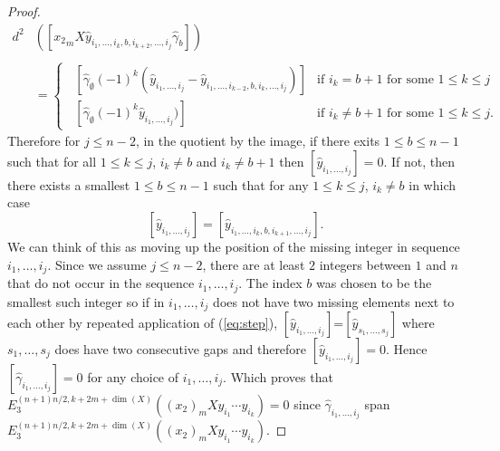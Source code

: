 \documentclass{article}
\theoremstyle{plain}
\theoremstyle{definition}
\numberwithin{thm}{section}
\begin{document}
\begin{proof}
				\begin{align*}
					d^2&([{x_2}_mX\hat{y}_{i_1,\dots,i_k,b,i_{k+2},\dots,i_j}\hat\gamma_b])
					\\
					\\
					&=
					\begin{cases}
							\;\; [\hat{\gamma}_{\emptyset}(-1)^{k}(\hat{y}_{i_1,\dots,i_j}-\hat{y}_{i_1,\dots,i_{k-2},b,i_k,\dots,i_j})] &\text{if  } i_{k}=b+1 \text{ for some } 1\leq k\leq j
							\\
							\;\; [\hat{\gamma}_{\emptyset}(-1)^{k}\hat{y}_{i_1,\dots,i_j})] &\text{if  } i_{k}\neq b+1 \text{ for some } 1\leq k\leq j.
					\end{cases}
				\end{align*}
				Therefore for $j\leq n-2$, in the quotient by the image, if there exits $1\leq b\leq n-1$ such that for all $1\leq k \leq j$,
				$i_k\neq b$ and $i_k \neq b+1$ then $[\hat{y}_{i_1,\dots,i_j}]=0$.
				If not, then there exists a smallest $1\leq b\leq n-1$ such that for any $1\leq k \leq j$, $i_k\neq b$ in which case
				\begin{equation}\label{eq:step}
				[\hat{y}_{i_1,\dots,i_j}]=[\hat{y}_{i_1,\dots,i_{k},b,i_{k+1},\dots,i_j}].
				\end{equation}
				We can think of this as moving up the position of the missing integer in sequence $i_1,\dots,i_j$. 
				Since we assume $j\leq n-2$, there are at least $2$ integers between $1$ and $n$ that do not occur in the sequence $i_1,\dotso,i_j$.
				The index $b$ was chosen to be the smallest such integer so if in $i_1,\dots,i_j$ does not have two missing elements next to each other by repeated application of
				(\ref{eq:step}),
				$[\hat{y}_{i_1,\dots,i_j}]$=$[\hat{y}_{s_1,\dots,s_j}]$ where $s_1,\dots,s_j$ does have two consecutive gaps and therefore $[\hat{y}_{i_1,\dots,i_j}]=0$.
				Hence $[\hat{\gamma}_{i_1,\dots,i_j}]=0$ for any choice of $i_1,\dots,i_j$.
				Which proves that $E_3^{(n+1)n/2,k+2m+\dim(X)}((x_2)_mXy_{i_1}\cdots y_{i_k})	=	0$ 
				since $\hat{\gamma}_{i_1,\dots,i_j}$ span $E_3^{(n+1)n/2,k+2m+\dim(X)}((x_2)_mXy_{i_1}\cdots y_{i_k})$.
				

\end{proof}
\end{document}
